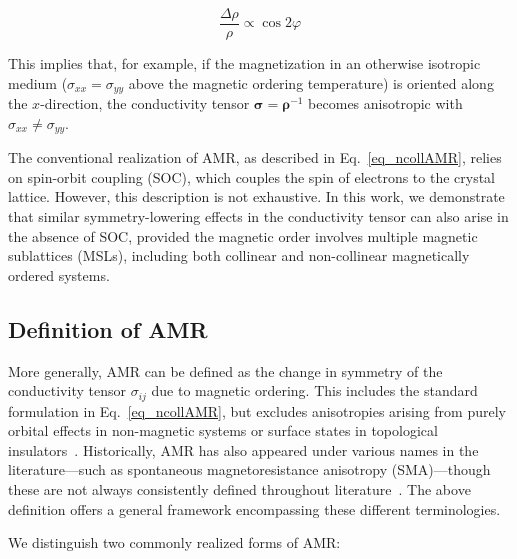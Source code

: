\documentclass[prb,showpacs,amsmath,amssymb,superscriptaddress,twocolumn,floatfix]{revtex4-1}
\begin{document}
\begin{equation}
	\frac{\Delta \rho}{\rho} \propto \cos 2\varphi
	\label{eq_ncollAMR}
\end{equation}

This implies that, for example, if the magnetization in an otherwise isotropic medium ($\sigma_{xx} = \sigma_{yy}$ above the magnetic ordering temperature) is oriented along the $x$-direction, the conductivity tensor $\boldsymbol{\sigma} = \boldsymbol{\rho}^{-1}$ becomes anisotropic with $\sigma_{xx} \neq \sigma_{yy}$.

The conventional realization of AMR, as described in Eq.~\ref{eq_ncollAMR}, relies on spin-orbit coupling (SOC), which couples the spin of electrons to the crystal lattice. However, this description is not exhaustive. In this work, we demonstrate that similar symmetry-lowering effects in the conductivity tensor can also arise in the absence of SOC, provided the magnetic order involves multiple magnetic sublattices (MSLs), including both collinear and non-collinear magnetically ordered systems.

\subsection{Definition of AMR}

More generally, AMR can be defined as the change in symmetry of the conductivity tensor $\sigma_{ij}$ due to magnetic ordering. This includes the standard formulation in Eq.~\ref{eq_ncollAMR}, but excludes anisotropies arising from purely orbital effects in non-magnetic systems or surface states in topological insulators~\cite{Ritzinger:2023}. Historically, AMR has also appeared under various names in the literature—such as spontaneous magnetoresistance anisotropy (SMA)—though these are not always consistently defined throughout literature~\cite{Ritzinger:2023}. The above definition offers a general framework encompassing these different terminologies.

We distinguish two commonly realized forms of AMR:
\end{document}
